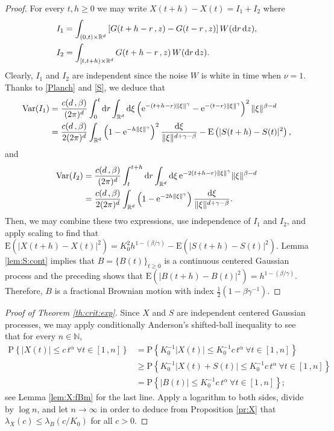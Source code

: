 \documentclass[reqno]{amsart}
\DeclareMathOperator{\Var}{Var}
\newcommand{\<}{\langle}
\renewcommand{\>}{\rangle}
\newcommand{\N}{\mathbb{N}}
\newcommand{\R}{\mathbb{R}}
\renewcommand{\P}{\mathrm{P}}
\newcommand{\E}{\mathrm{E}}
\newcommand{\1}{\mathbb{1}}
\renewcommand{\d}{{\rm d}}
\newcommand{\e}{{\rm e}}
\renewcommand{\ge}{\geqslant}
\renewcommand{\le}{\leqslant}
\theoremstyle{definition}
\numberwithin{equation}{section}
\begin{document}
\begin{proof}
	For every $t, h \ge 0$ we may write $X(t+h) - X(t) = I_1+I_2$ where
	\begin{align*}
		I_1&= \int_{(0,t)\times\R^d} \left[G(t+h-r\,,z) - G(t-r\,,z)\right] W(\d r\,\d z),\\
		I_2&=\int_{[t, t+h) \times\R^d} G(t+h-r\,,z)\, W(\d r\,\d z).
	\end{align*}
	Clearly, $I_1$ and $I_2$ are independent since the noise $W$ is white in time when $\nu=1$.
	Thanks to \eqref{Planch} and \eqref{S}, we deduce that
	\begin{align*}
		\Var(I_1)&=\frac{c(d\,,\beta)}{(2\pi)^d}\int_0^t \d r 
			\int_{\R^d} \d \xi \left(\e^{-(t+h-r)\|\xi\|^\gamma} - 
			\e^{-(t-r)\|\xi\|^\gamma}\right)^2\|\xi\|^{\beta-d}\\
		&=\frac{c(d\,,\beta)}{2(2\pi)^d} \int_{\R^d} 
			\left( 1-\e^{-h\|\xi\|^\gamma} \right)^2\frac{\d \xi}{\|\xi\|^{d+\gamma-\beta}}
			- \E\left( |S(t+h)-S(t)|^2 \right),
	\end{align*}
	and
	\begin{align*}
		\Var(I_2) &= \frac{c(d\,,\beta)}{(2\pi)^d} \int_t^{t+h} \d r \int_{\R^d} 
			\d\xi \, \e^{-2(t+h-r)\|\xi\|^\gamma} \|\xi\|^{\beta-d}\\
			&= \frac{c(d\,,\beta)}{2(2\pi)^d} \int_{\R^d} 
			\left( 1 - \e^{-2h\|\xi\|^\gamma}\right) \frac{\d\xi}{\|\xi\|^{d+\gamma-\beta}}.
	\end{align*}
	Then, we may combine these two expressions, use independence 
	of $I_1$ and $I_2$, and apply scaling to find that
	$\E( |X(t+h)-X(t)|^2 )
		= K_0^2 h^{1-(\beta/\gamma)} - \E( |S(t+h)-S(t)|^2 ).$
	Lemma \ref{lem:S:cont} implies that $B=\{B(t)\}_{t \ge 0}$ 
	is a continuous centered Gaussian process and the preceding 
	shows that $\E(|B(t+h)-B(t)|^2) = h^{1-(\beta/\gamma)}$.
	Therefore, $B$ is a fractional Brownian motion with index
	$\frac12 (1-\beta\gamma^{-1})$.
\end{proof}


\begin{proof}[Proof of Theorem \ref{th:crit:exp}]
	Since $X$ and $S$ are independent centered Gaussian processes, 
	we may apply conditionally Anderson's shifted-ball inequality 
	\cite{Anderson55} to see that for every $n \in \N$,
	\begin{align*}
		\P\left\{ |X(t)| \le c\, t^\alpha\ \forall t \in [1\,,n] \right\}
			&=\P\left\{ K_0^{-1}|X(t)| \le K_0^{-1} c\, t^\alpha\ \forall t \in [1\,,n] \right\}\\
		&\ge \P\left\{ K_0^{-1}|X(t)+S(t)| \le K_0^{-1} c\,t^\alpha\ \forall t \in [1\,,n] \right\}\\
		&= \P\left\{ |B(t)| \le K_0^{-1} c\,t^\alpha\ \forall t \in [1\,,n] \right\};
	\end{align*}
	see Lemma \ref{lem:X:fBm} for the last line.
	Apply a logarithm to both sides, divide by $\log n$, and let $n \to \infty$ in order to deduce
	from Proposition \ref{pr:X} that $\lambda_X(c) \le \lambda_B(c/K_0)$ for all $c>0$.
\end{proof}
\end{document}
